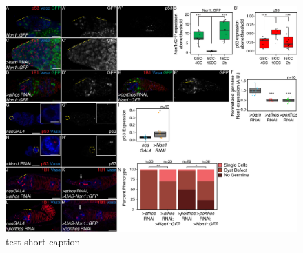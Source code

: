 \documentclass[12pt,oneside]{reedthesis}
\begin{document}
\begin{figure}

{\centering \includegraphics[width=7 in,height=5.409091 in]{./figure/Ribosome Biogenesis/Ribosome Biogenesis 5S} 

}

\caption[test short caption]{test short caption}\label{fig:unnamed-chunk-15}
\end{figure}
\end{document}
